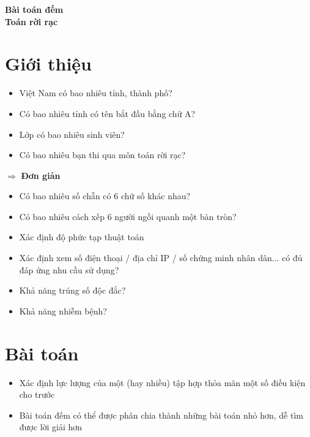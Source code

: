 \documentclass[12pt,a4paper]{article}
\begin{document}
\begin{center}
    {\LARGE \textbf{Bài toán đếm}}\\[0.3cm]
    {\large \textbf{Toán rời rạc}}
\end{center}
\vspace{0.5cm}

\section*{Giới thiệu}
\begin{itemize}
    \item Việt Nam có bao nhiêu tỉnh, thành phố?
    \item Có bao nhiêu tỉnh có tên bắt đầu bằng chữ A?
    \item Lớp có bao nhiêu sinh viên?
    \item Có bao nhiêu bạn thi qua môn toán rời rạc?
\end{itemize}
$\Rightarrow$ \textbf{Đơn giản}

\begin{itemize}
    \item Có bao nhiêu số chẵn có 6 chữ số khác nhau?
    \item Có bao nhiêu cách xếp 6 người ngồi quanh một bàn tròn?
\end{itemize}

\begin{itemize}
    \item Xác định độ phức tạp thuật toán
    \item Xác định xem số điện thoại / địa chỉ IP / số chứng minh nhân dân... có đủ đáp ứng nhu cầu sử dụng?
    \item Khả năng trúng số độc đắc?
    \item Khả năng nhiễm bệnh?
\end{itemize}

\section*{Bài toán}
\begin{itemize}
    \item Xác định lực lượng của một (hay nhiều) tập hợp thỏa mãn một số điều kiện cho trước
    \item Bài toán đếm có thể được phân chia thành những bài toán nhỏ hơn, dễ tìm được lời giải hơn
\end{itemize}

\hrulefill
\end{document}
